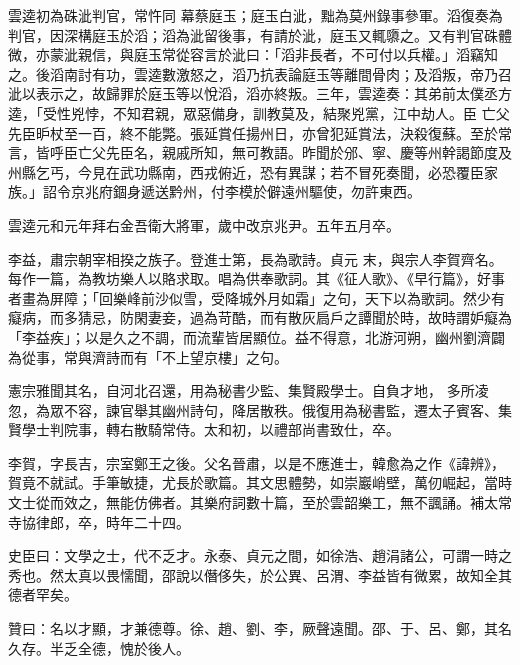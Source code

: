 \begin{pinyinscope}
 雲逵初為硃泚判官，常忤同
 幕蔡庭玉；庭玉白泚，黜為莫州錄事參軍。滔復奏為判官，因深構庭玉於滔；滔為泚留後事，有請於泚，庭玉又輒隳之。又有判官硃體微，亦蒙泚親信，與庭玉常從容言於泚曰：「滔非長者，不可付以兵權。」滔竊知之。後滔南討有功，雲逵數激怒之，滔乃抗表論庭玉等離間骨肉；及滔叛，帝乃召泚以表示之，故歸罪於庭玉等以悅滔，滔亦終叛。三年，雲逵奏：其弟前太僕丞方逵，「受性兇悖，不知君親，眾惡備身，訓教莫及，結聚兇黨，江中劫人。臣
 亡父先臣昈杖至一百，終不能斃。張延賞任揚州日，亦曾犯延賞法，決殺復蘇。至於常言，皆呼臣亡父先臣名，親戚所知，無可教語。昨聞於邠、寧、慶等州幹謁節度及州縣乞丐，今見在武功縣南，西戎俯近，恐有異謀；若不冒死奏聞，必恐覆臣家族。」詔令京兆府錮身遞送黔州，付李模於僻遠州驅使，勿許東西。



 雲逵元和元年拜右金吾衛大將軍，歲中改京兆尹。五年五月卒。



 李益，肅宗朝宰相揆之族子。登進士第，長為歌詩。貞元
 末，與宗人李賀齊名。每作一篇，為教坊樂人以賂求取。唱為供奉歌詞。其《征人歌》、《早行篇》，好事者畫為屏障；「回樂峰前沙似雪，受降城外月如霜」之句，天下以為歌詞。然少有癡病，而多猜忌，防閑妻妾，過為苛酷，而有散灰扃戶之譚聞於時，故時謂妒癡為「李益疾」；以是久之不調，而流輩皆居顯位。益不得意，北游河朔，幽州劉濟闢為從事，常與濟詩而有「不上望京樓」之句。



 憲宗雅聞其名，自河北召還，用為秘書少監、集賢殿學士。自負才地，
 多所凌忽，為眾不容，諫官舉其幽州詩句，降居散秩。俄復用為秘書監，遷太子賓客、集賢學士判院事，轉右散騎常侍。太和初，以禮部尚書致仕，卒。



 李賀，字長吉，宗室鄭王之後。父名晉肅，以是不應進士，韓愈為之作《諱辨》，賀竟不就試。手筆敏捷，尤長於歌篇。其文思體勢，如崇巖峭壁，萬仞崛起，當時文士從而效之，無能仿佛者。其樂府詞數十篇，至於雲韶樂工，無不諷誦。補太常寺協律郎，卒，時年二十四。



 史臣曰：文學之士，代不乏才。永泰、貞元之間，如徐浩、趙涓諸公，可謂一時之秀也。然太真以畏懦聞，邵說以僭侈失，於公異、呂渭、李益皆有微累，故知全其德者罕矣。



 贊曰：名以才顯，才兼德尊。徐、趙、劉、李，厥聲遠聞。邵、于、呂、鄭，其名久存。半乏全德，愧於後人。



\end{pinyinscope}